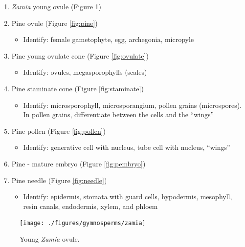 \begin{enumerate}
\def\labelenumi{\arabic{enumi}.}
\tightlist
\item
  \emph{Zamia} young ovule (Figure \ref{fig:zamia})
\item
  Pine ovule (Figure \ref{fig:pine})

  \begin{itemize}
  \tightlist
  \item
    Identify: female gametophyte, egg, archegonia, micropyle
  \end{itemize}
\item
  Pine young ovulate cone (Figure \ref{fig:ovulate})

  \begin{itemize}
  \tightlist
  \item
    Identify: ovules, megasporophylls (scales)
  \end{itemize}
\item
  Pine staminate cone (Figure \ref{fig:staminate})

  \begin{itemize}
  \tightlist
  \item
    Identify: microsporophyll, microsporangium, pollen grains
    (microspores). In pollen grains, differentiate between the cells and
    the ``wings''
  \end{itemize}
\item
  Pine pollen (Figure \ref{fig:pollen})

  \begin{itemize}
  \tightlist
  \item
    Identify: generative cell with nucleus, tube cell with nucleus,
    ``wings''
  \end{itemize}
\item
  Pine - mature embryo (Figure \ref{fig:pembryo})
\item
  Pine needle (Figure \ref{fig:needle})

  \begin{itemize}
  \tightlist
  \item
    Identify: epidermis, stomata with guard cells, hypodermis,
    mesophyll, resin canals, endodermis, xylem, and phloem
  \end{itemize}
\end{enumerate}

\begin{figure}

{\centering \texttt{[image: ./figures/gymnosperms/zamia]}

}

\caption{Young \emph{Zamia} ovule.}\label{fig:zamia}
\end{figure}

